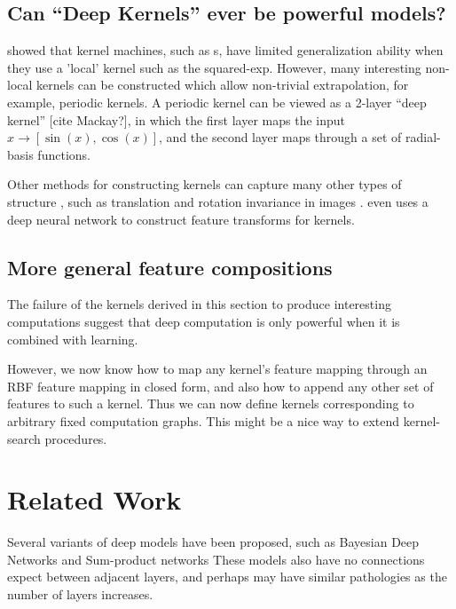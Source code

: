 \documentclass{article}
\begin{document}
\subsection{Can ``Deep Kernels'' ever be powerful models?}

\cite{NIPS2005_424} showed that kernel machines, such as \gp{}s, have limited generalization ability when they use a 'local' kernel such as the squared-exp.  However, many interesting non-local kernels can be constructed which allow non-trivial extrapolation, for example, periodic kernels. A periodic kernel can be viewed as a 2-layer ``deep kernel'' [cite Mackay?], in which the first layer maps the input $x \rightarrow [\sin(x), \cos(x)]$, and the second layer maps through a set of radial-basis functions.  

Other methods for constructing kernels can capture many other types of structure \cite{DuvLloGroetal13, wilsonadams2013}, such as translation and rotation invariance in images \cite{kondor2008group}.  \cite{SalHin08} even uses a deep neural network to construct feature transforms for kernels.

\subsection{More general feature compositions}

The failure of the kernels derived in this section to produce interesting computations suggest that deep computation is only powerful when it is combined with learning.  

However, we now know how to map any kernel's feature mapping through an RBF feature mapping in closed form, and also how to append any other set of features to such a kernel.  Thus we can now define kernels corresponding to arbitrary fixed computation graphs.  This might be a nice way to extend kernel-search procedures.


\section{Related Work}


Several variants of deep models have been proposed, such as Bayesian Deep Networks \cite{adams2010learning} and Sum-product networks \cite{poon2011sum}  
These models also have no connections expect between adjacent layers, and perhaps may have similar pathologies as the number of layers increases.
\end{document}
